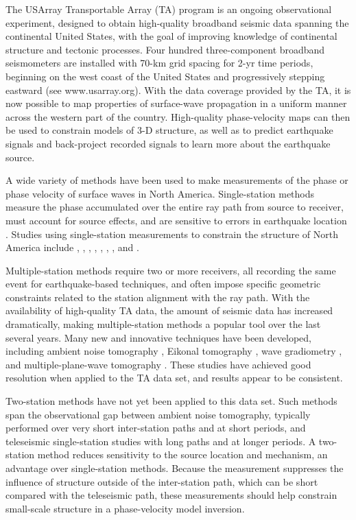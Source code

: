 \documentclass[12pt,oneside]{book}
\begin{document}
The USArray Transportable Array (TA) program is an ongoing observational experiment, designed to obtain high-quality broadband seismic data spanning the continental United States, with the goal of improving knowledge of continental structure and tectonic processes.  Four hundred three-component broadband seismometers are installed with 70\nobreakdash-km grid spacing for 2\nobreakdash-yr time periods, beginning on the west coast of the United States and progressively stepping eastward (see www.usarray.org). With the data coverage provided by the TA, it is now possible to map properties of surface-wave propagation in a uniform manner across the western part of the country. High-quality phase-velocity maps can then be used to constrain models of 3\nobreakdash-D structure, as well as to predict earthquake signals and back-project recorded signals to learn more about the earthquake source. 
 
A wide variety of methods have been used to make measurements of the phase or phase velocity of surface waves in North America. Single-station methods measure the phase accumulated over the entire ray path from source to receiver, must account for source effects, and are sensitive to errors in earthquake location \citep[e.g.,][]{Trampert1995}.  Studies using single-station measurements to constrain the structure of North America include \citet{Lee1979}, \citet{vdLeeNolet1997}, \citet{Godey2003}, \citet{vanderlee2005}, \citet{Maroneetal2007}, \citet{Nettles&Dziewonski2008}, \citet{Pollitz2010}, and \citet{Yuanetal2011}. 

Multiple-station methods require two or more receivers, all recording the same event for earthquake-based techniques, and often impose specific geometric constraints related to the station alignment with the ray path. With the availability of high-quality TA data, the amount of seismic data has increased dramatically, making multiple-station methods a popular tool over the last several years. Many new and innovative techniques have been developed, including ambient noise tomography \citep[e.g.,][]{Shapiroetal2005}, Eikonal tomography \citep{Lin2009}, wave gradiometry \citep{Liang2009}, and multiple-plane-wave tomography \citep{Forsyth2005, Yang2006a}. These studies have achieved good resolution when applied to the TA data set, and results appear to be consistent. 

Two-station methods have not yet been applied to this data set. Such methods span the observational gap between ambient noise tomography, typically performed over very short inter-station paths and at short periods, and teleseismic single-station studies with long paths and at longer periods.  A two-station method reduces sensitivity to the source location and mechanism, an advantage over single-station methods. Because the measurement suppresses the influence of structure outside of the inter-station path, which can be short compared with the teleseismic path, these measurements should help constrain small-scale structure in a phase-velocity model inversion. 
\end{document}
